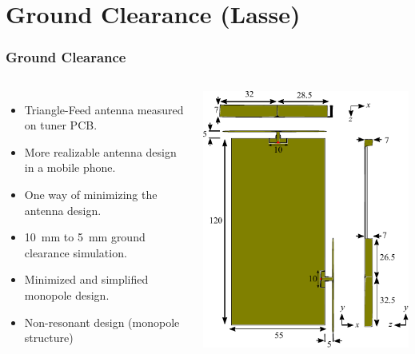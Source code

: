 \section[Ground Clearance]{Ground Clearance (Lasse)}
\def\legendfooter{\scriptsize{Upper: Top antenna. Lower: Side antenna. \textcolor{bb}{Monopole Sim}, \textcolor{gg}{Monopole Meas}, \textcolor{rr}{Triangle-Feed Meas}, Frequency in MHz.}}
\def\emptyline{\textcolor{white}{Empty}}

\begin{frame}[fragile]
  \frametitle{Ground Clearance}
  \begin{columns}[onlytextwidth,t]
      \begin{itemize}
      \item Triangle-Feed antenna measured on tuner PCB.
      \item More realizable antenna design in a mobile phone.
      \item One way of minimizing the antenna design.
      \item \SI{10}{mm} to \SI{5}{mm} ground clearance simulation.
      \item Minimized and simplified monopole design.
      \item Non-resonant design (monopole structure)
      \end{itemize}
    \begin{center}
      \includegraphics[scale=0.7]{img/Lasse/3d_drawing_mini.pdf}
    \end{center}
  \end{columns}
\end{frame}


